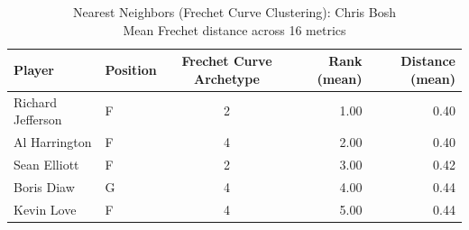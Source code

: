 \begin{table}[t]
\caption*{
{\fontsize{20}{25} Nearest Neighbors (Frechet Curve Clustering): Chris Bosh\fontsize{12}{15}\selectfont } \\ 
{\fontsize{14}{17}\selectfont  Mean Frechet distance across 16 metrics\fontsize{12}{15}\selectfont }
} 
\fontsize{12.0pt}{14.0pt}\selectfont
\begin{tabular*}{\linewidth}{@{\extracolsep{\fill}}llcrr}
\toprule
Player & Position & Frechet Curve Archetype & Rank (mean) & Distance (mean) \\ 
\midrule\addlinespace[2.5pt]
Richard Jefferson & F & 2 & 1.00 & 0.40 \\ 
Al Harrington & F & 4 & 2.00 & 0.40 \\ 
Sean Elliott & F & 2 & 3.00 & 0.42 \\ 
Boris Diaw & G & 4 & 4.00 & 0.44 \\ 
Kevin Love & F & 4 & 5.00 & 0.44 \\ 
\bottomrule
\end{tabular*}
\end{table}


